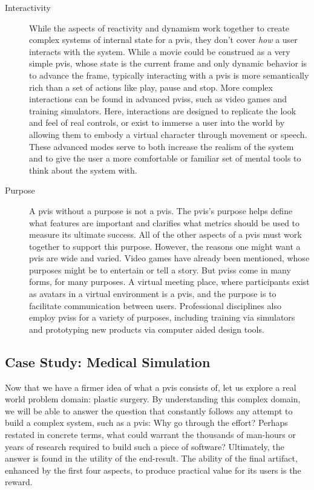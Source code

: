 \documentclass[12pt,oneside,letterpaper]{memoir}
\begin{document}
\begin{description}
\item[Interactivity] While the aspects of reactivity and dynamism work
  together to create complex systems of internal state for a
  \gls{pvis}, they don't cover \textit{how} a user interacts with the
  system. While a movie could be construed as a very simple
  \gls{pvis}, whose state is the current frame and only dynamic
  behavior is to advance the frame, typically interacting with a
  \gls{pvis} is more semantically rich than a set of actions like
  play, pause and stop. More complex interactions can be found in
  advanced \glspl{pvis}, such as video games and training
  simulators. Here, interactions are designed to replicate the look
  and feel of real controls, or exist to immerse a user into the world
  by allowing them to embody a virtual character through movement or
  speech. These advanced modes serve to both increase the realism of
  the system and to give the user a more comfortable or familiar set
  of mental tools to think about the system with.

\item[Purpose] A \gls{pvis} without a purpose is not a \gls{pvis}. The
  \gls{pvis}'s purpose helps define what features are important and
  clarifies what metrics should be used to measure its ultimate
  success. All of the other aspects of a \gls{pvis} must work together
  to support this purpose.  However, the reasons one might want a
  \gls{pvis} are wide and varied. Video games have already been
  mentioned, whose purposes might be to entertain or tell a story. But
  \glspl{pvis} come in many forms, for many purposes. A virtual
  meeting place, where participants exist as avatars in a virtual
  environment is a \gls{pvis}, and the purpose is to facilitate
  communication between users. Professional disciplines also employ
  \glspl{pvis} for a variety of purposes, including training via
  simulators and prototyping new products via computer aided design
  tools.
      
\end{description}

\subsection{Case Study: Medical Simulation}

Now that we have a firmer idea of what a \acrlong{pvis} consists of,
let us explore a real world problem domain: plastic surgery. By
understanding this complex domain, we will be able to answer the
question that constantly follows any attempt to build a complex
system, such as a \gls{pvis}: Why go through the effort?  Perhaps
restated in concrete terms, what could warrant the thousands of
man-hours or years of research required to build such a piece of
software? Ultimately, the answer is found in the utility of the
end-result. The ability of the final artifact, enhanced by the first
four aspects, to produce practical value for its users is the reward.
\end{document}
